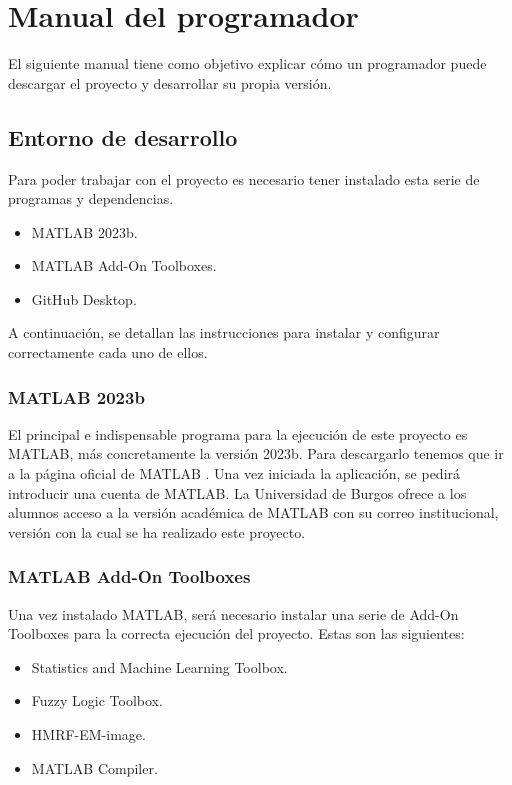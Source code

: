 \section{Manual del programador}\label{manual-del-programador}

El siguiente manual tiene como objetivo explicar cómo un programador puede descargar el proyecto y desarrollar su propia versión.

\subsection{Entorno de desarrollo}\label{entorno-de-desarrollo}

Para poder trabajar con el proyecto es necesario tener instalado esta serie de programas y dependencias.

\begin{itemize}
    \item MATLAB 2023b.
    \item MATLAB Add-On Toolboxes.
    \item GitHub Desktop.
\end{itemize}

A continuación, se detallan las instrucciones para instalar y configurar correctamente cada uno de ellos.

\subsubsection{MATLAB 2023b}\label{matlab-2023b}

El principal e indispensable programa para la ejecución de este proyecto es MATLAB, más concretamente la versión 2023b. Para descargarlo tenemos que ir a la página oficial de MATLAB \cite{matlab2023b}. Una vez iniciada la aplicación, se pedirá introducir una cuenta de MATLAB. La Universidad de Burgos ofrece a los alumnos acceso a la versión académica de MATLAB con su correo institucional, versión con la cual se ha realizado este proyecto.

\subsubsection{MATLAB Add-On Toolboxes}\label{matlab-toolboxes}

Una vez instalado MATLAB, será necesario instalar una serie de Add-On Toolboxes para la correcta ejecución del proyecto. Estas son las siguientes:

\begin{itemize}
    \item Statistics and Machine Learning Toolbox.
    \item Fuzzy Logic Toolbox.
    \item HMRF-EM-image.
    \item MATLAB Compiler.
\end{itemize}

